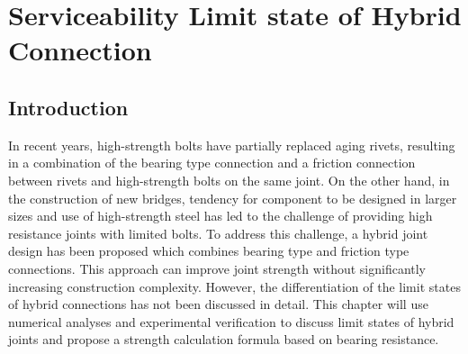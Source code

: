 \chapter{Serviceability Limit state of Hybrid Connection}
\label{ch7}

\begin{spacing}{1.25} %
\minitoc %
\end{spacing} %
\onehalfspacing %



\section{Introduction}

In recent years, high-strength bolts have partially replaced aging rivets, resulting in a combination of the bearing type connection and a friction connection between rivets and high-strength bolts on the same joint. On the other hand, in the construction of new bridges, tendency for component to be designed in larger sizes and use of high-strength steel has led to the challenge of providing high resistance joints with limited bolts. To address this challenge, a hybrid joint design has been proposed which combines bearing type and friction type connections. This approach can improve joint strength without significantly increasing construction complexity. However, the differentiation of the limit states of hybrid connections has not been discussed in detail. This chapter will use numerical analyses and experimental verification to discuss limit states of hybrid joints and propose a strength calculation formula based on bearing resistance.



